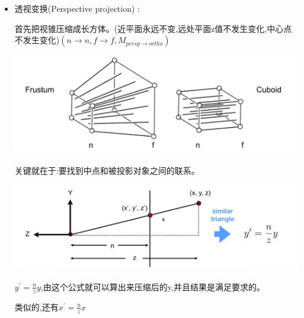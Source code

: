 \documentclass[UTF8]{ctexbook}
\begin{document}
{{{{\begin{itemize}
{\begin{itemize}
{                        \begin{itemize}
                          \item 注意:由于视线方向沿着-z,所以$n>f$
                          \item 这就是为啥OpenGL用的是左手系
                        \end{itemize}
                        }
                  \item {
                        透视变换(Perspective projection) :

                        首先把视锥压缩成长方体。(近平面永远不变,远处平面z值不发生变化,中心点不发生变化)$(n \to n,f \to f,M_{persp \to ortho})$

                        \includegraphics[scale=0.5]{resources/perspectiveProjection.png}

                        关键就在于:要找到中点和被投影对象之间的联系。

                        \includegraphics[scale=0.5]{resources/perspectiveProjection_middle.png}

                        $y^\prime = \frac{n}{z}y$,由这个公式就可以算出来压缩后的y,并且结果是满足要求的。

                        类似的,还有$x^\prime = \frac{n}{z}x$

}
\end{itemize}}
\end{itemize}}}}}
\end{document}
